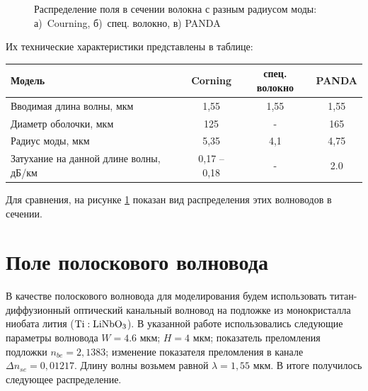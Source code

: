 \begin{figure}[h!]
	\begin{minipage}[h]{0.49\linewidth}
	\end{minipage}
	\hfill
	\begin{minipage}[h]{0.49\linewidth}
	\end{minipage}
	\vfill
	\begin{minipage}[h]{0.49\linewidth}
	\end{minipage}
	\hfill
	\begin{minipage}[h]{0.49\linewidth}
	\end{minipage}
	\caption{Распределение поля в сечении волокна с разным радиусом моды: а)~Courning, б)~спец. волокно, в) PANDA}
	\label{diameter}
\end{figure}

Их технические характеристики представлены в таблице:
\begin{center}
\begin{tabular}{|p{6cm}|c|c|c|}
\hline
Модель & Corning & спец. волокно & PANDA \\
\hline
Вводимая длина волны, мкм & 1,55 & 1,55 & 1,55 \\
\hline
Диаметр оболочки, мкм & 125 & - & 165 \\
\hline
Радиус моды, мкм & 5,35 & 4,1 & 4,75 \\
\hline
Затухание на данной длине волны, дБ/км & 0,17 – 0,18 & - & 2.0 \\
\hline
\end{tabular}
\end{center}

Для сравнения, на рисунке \ref{diameter} показан вид распределения этих волноводов в сечении.

\section{Поле полоскового волновода}
\label{strip_field}
В качестве полоскового волновода для моделирования будем использовать титан-диффузионный оптический канальный волновод на подложке из монокристалла ниобата лития ($\rm Ti:LiNbO_3$)\cite{vlada}. В указанной работе использовались следующие параметры волновода $W=4.6$ мкм; $H=4$ мкм; показатель преломления подложки $n_{be}=2,1383$; изменение показателя преломления в канале $\Delta n_{se}=0,01217$. Длину волны возьмем равной $\lambda = 1,55$ мкм. В итоге получилось следующее распределение.

